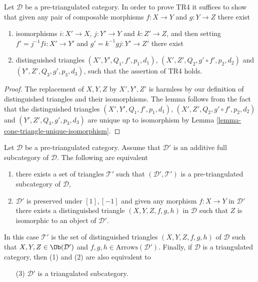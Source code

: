 \begin{lemma}
\label{lemma-easier-axiom-four}
Let $\mathcal{D}$ be a pre-triangulated category.
In order to prove TR4 it suffices to show that given
any pair of composable morphisms
$f : X \to Y$ and $g : Y \to Z$ there exist
\begin{enumerate}
\item isomorphisms $i : X' \to X$, $j : Y' \to Y$ and
$k : Z' \to Z$, and then setting $f' = j^{-1}fi : X' \to Y'$ and
$g' = k^{-1}gj : Y' \to Z'$ there exist
\item distinguished triangles
$(X', Y', Q_1, f', p_1, d_1)$,
$(X', Z', Q_2, g' \circ f', p_2, d_2)$
and
$(Y', Z', Q_3, g', p_3, d_3)$,
such that the assertion of TR4 holds.
\end{enumerate}
\end{lemma}

\begin{proof}
The replacement of $X, Y, Z$ by $X', Y', Z'$ is harmless by our
definition of distinguished triangles and their isomorphisms.
The lemma follows from the fact that the distinguished triangles
$(X', Y', Q_1, f', p_1, d_1)$,
$(X', Z', Q_2, g' \circ f', p_2, d_2)$
and
$(Y', Z', Q_3, g', p_3, d_3)$
are unique up to isomorphism by
Lemma \ref{lemma-cone-triangle-unique-isomorphism}.
\end{proof}

\begin{lemma}
\label{lemma-triangulated-subcategory}
Let $\mathcal{D}$ be a pre-triangulated category.
Assume that $\mathcal{D}'$ is an additive full subcategory of $\mathcal{D}$.
The following are equivalent
\begin{enumerate}
\item there exists a set of triangles $\mathcal{T}'$ such that
$(\mathcal{D}', \mathcal{T}')$ is a pre-triangulated subcategory
of $\mathcal{D}$,
\item $\mathcal{D}'$ is preserved under $[1], [-1]$ and
given any morphism $f : X \to Y$ in $\mathcal{D}'$ there exists
a distinguished triangle $(X, Y, Z, f, g, h)$ in $\mathcal{D}$
such that $Z$ is isomorphic to an object of $\mathcal{D}'$.
\end{enumerate}
In this case $\mathcal{T}'$ is the set of distinguished triangles
$(X, Y, Z, f, g, h)$ of $\mathcal{D}$ such that
$X, Y, Z \in \Ob(\mathcal{D}')$ and
$f, g, h \in \text{Arrows}(\mathcal{D}')$. Finally, if $\mathcal{D}$
is a triangulated category, then (1) and (2) are also equivalent to
\begin{enumerate}
\item[(3)] $\mathcal{D}'$ is a triangulated subcategory.
\end{enumerate}
\end{lemma}

